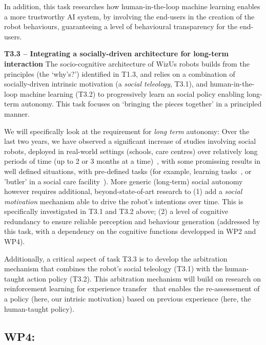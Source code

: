 \documentclass[11pt,a4paper]{report}
\newcommand{\project}{WizUs\xspace}
\begin{document}
In addition, this task researches how human-in-the-loop machine learning enables a more
trustworthy AI system, by involving the end-users in the creation of the robot
behaviours, guaranteeing a level of behavioural transparency for the end-users.

\textbf{T3.3 -- Integrating a socially-driven architecture for long-term interaction} The
socio-cognitive architecture of \project robots builds from the principles (the
`why's?') identified in T1.3, and relies on a combination of socially-driven
intrinsic motivation (a \emph{social teleology}, T3.1), and human-in-the-loop machine
learning (T3.2) to progressively learn an social policy enabling long-term
autonomy. This task focuses on `bringing the pieces together' in a principled
manner.

We will specifically look at the requirement for \emph{long term} autonomy: Over
the last two years, we have observed a significant increase of studies
involving social robots, deployed in real-world settings (schools, care centres)
over relatively long periods of time (up to 2 or 3 months at a
time)~\cite{kunze2018artificial,leite2013social}, with some promissing results
in well defined situations, with pre-defined tasks (for example, learning
tasks~\cite{senft2019teaching}, or 'butler' in a social care
facility~\cite{hawes2017strands}). More generic (long-term) social autonomy
however requires additional, beyond-state-of-art research to (1) add a
\emph{social motivation} mechanism able to drive the robot's intentions over
time. This is specifically investigated in T3.1 and T3.2 above; (2) a level of
cognitive redundancy to ensure reliable perception and behaviour generation
(addressed by this task, with a dependency on the cognitive functions developped
in WP2 and WP4).

Additionally, a critical aspect of task T3.3 is to develop the arbitration
mechanism that combines the robot's social teleology (T3.1) with the human-taught
action policy (T3.2). This arbitration mechanism will build on research on
reinforcement learning for experience transfer~\cite{madden2004transfer} that
enables the re-assessement of a policy (here, our intrisic motivation) based on
previous experience (here, the human-taught policy).



\subsection{WP4: \textbf{\wpFour}} 
\end{document}
